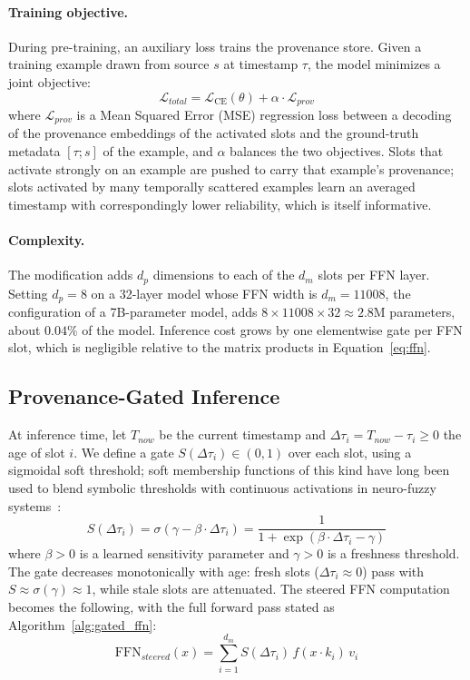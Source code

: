\documentclass[manuscript, screen, review]{jair}
\begin{document}
\paragraph{Training objective.} During pre-training, an auxiliary loss trains the provenance store. Given a training example drawn from source $s$ at timestamp $\tau$, the model minimizes a joint objective:
\begin{equation}
  \mathcal{L}_{total} = \mathcal{L}_{\text{CE}}(\theta) + \alpha \cdot \mathcal{L}_{prov}
\end{equation}
where $\mathcal{L}_{prov}$ is a Mean Squared Error (MSE) regression loss between a decoding of the provenance embeddings of the activated slots and the ground-truth metadata $[\tau; s]$ of the example, and $\alpha$ balances the two objectives. Slots that activate strongly on an example are pushed to carry that example's provenance; slots activated by many temporally scattered examples learn an averaged timestamp with correspondingly lower reliability, which is itself informative.

\paragraph{Complexity.} The modification adds $d_p$ dimensions to each of the $d_m$ slots per FFN layer. Setting $d_p = 8$ on a 32-layer model whose FFN width is $d_m = 11008$, the configuration of a 7B-parameter model, adds $8 \times 11008 \times 32 \approx 2.8$M parameters, about $0.04\%$ of the model. Inference cost grows by one elementwise gate per FFN slot, which is negligible relative to the matrix products in Equation~\ref{eq:ffn}.

\subsection{Provenance-Gated Inference}
\label{sec:gating}

At inference time, let $T_{now}$ be the current timestamp and $\Delta\tau_i = T_{now} - \tau_i \geq 0$ the age of slot $i$. We define a gate $S(\Delta\tau_i) \in (0, 1)$ over each slot, using a sigmoidal soft threshold; soft membership functions of this kind have long been used to blend symbolic thresholds with continuous activations in neuro-fuzzy systems~\citep{thakur2021neurofuzzy}:
\begin{equation}
  \label{eq:gate}
  S(\Delta\tau_i) = \sigma\!\left( \gamma - \beta \cdot \Delta\tau_i \right)
  = \frac{1}{1 + \exp\!\left(\beta \cdot \Delta\tau_i - \gamma\right)}
\end{equation}
where $\beta > 0$ is a learned sensitivity parameter and $\gamma > 0$ is a freshness threshold. The gate decreases monotonically with age: fresh slots ($\Delta\tau_i \approx 0$) pass with $S \approx \sigma(\gamma) \approx 1$, while stale slots are attenuated. The steered FFN computation becomes the following, with the full forward pass stated as Algorithm~\ref{alg:gated_ffn}:
\begin{equation}
  \label{eq:steering}
  \text{FFN}_{steered}(x) = \sum_{i=1}^{d_m} S(\Delta\tau_i)\, f(x \cdot k_i)\, v_i
\end{equation}
\end{document}
